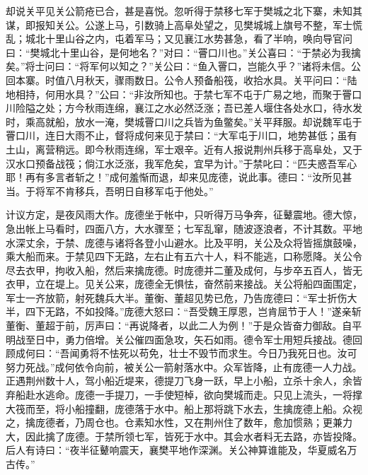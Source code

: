 却说关平见关公箭疮已合，甚是喜悦。忽听得于禁移七军于樊城之北下寨，未知其谋，即报知关公。公遂上马，引数骑上高阜处望之，见樊城城上旗号不整，军士慌乱；城北十里山谷之内，屯着军马；又见襄江水势甚急，看了半响，唤向导官问曰：“樊城北十里山谷，是何地名？”对曰：“罾口川也。”关公喜曰：“于禁必为我擒矣。”将士问曰：“将军何以知之？”关公曰：“鱼入罾口，岂能久乎？”诸将未信。公回本寨。时值八月秋天，骤雨数日。公令人预备船筏，收拾水具。关平问曰：“陆地相持，何用水具？”公曰：“非汝所知也。于禁七军不屯于广易之地，而聚于罾口川险隘之处；方今秋雨连绵，襄江之水必然泛涨；吾已差人堰住各处水口，待水发时，乘高就船，放水一淹，樊城罾口川之兵皆为鱼鳖矣。”关平拜服。却说魏军屯于罾口川，连日大雨不止，督将成何来见于禁曰：“大军屯于川口，地势甚低；虽有土山，离营稍远。即今秋雨连绵，军士艰辛。近有人报说荆州兵移于高阜处，又于汉水口预备战筏；倘江水泛涨，我军危矣，宜早为计。”于禁叱曰：“匹夫惑吾军心耶！再有多言者斩之！”成何羞惭而退，却来见庞德，说此事。德曰：“汝所见甚当。于将军不肯移兵，吾明日自移军屯于他处。”

计议方定，是夜风雨大作。庞德坐于帐中，只听得万马争奔，征鼙震地。德大惊，急出帐上马看时，四面八方，大水骤至；七军乱窜，随波逐浪者，不计其数。平地水深丈余，于禁、庞德与诸将各登小山避水。比及平明，关公及众将皆摇旗鼓噪，乘大船而来。于禁见四下无路，左右止有五六十人，料不能逃，口称愿降。关公令尽去衣甲，拘收入船，然后来擒庞德。时庞德并二董及成何，与步卒五百人，皆无衣甲，立在堤上。见关公来，庞德全无惧怯，奋然前来接战。关公将船四面围定，军士一齐放箭，射死魏兵大半。董衡、董超见势已危，乃告庞德曰：“军士折伤大半，四下无路，不如投降。”庞德大怒曰：“吾受魏王厚恩，岂肯屈节于人！”遂亲斩董衡、董超于前，厉声曰：“再说降者，以此二人为例！”于是众皆奋力御敌。自平明战至日中，勇力倍增。关公催四面急攻，矢石如雨。德令军士用短兵接战。德回顾成何曰：“吾闻勇将不怯死以苟免，壮士不毁节而求生。今日乃我死日也。汝可努力死战。”成何依令向前，被关公一箭射落水中。众军皆降，止有庞德一人力战。正遇荆州数十人，驾小船近堤来，德提刀飞身一跃，早上小船，立杀十余人，余皆弃船赴水逃命。庞德一手提刀，一手使短棹，欲向樊城而走。只见上流头，一将撑大筏而至，将小船撞翻，庞德落于水中。船上那将跳下水去，生擒庞德上船。众视之，擒庞德者，乃周仓也。仓素知水性，又在荆州住了数年，愈加惯熟；更兼力大，因此擒了庞德。于禁所领七军，皆死于水中。其会水者料无去路，亦皆投降。后人有诗曰：“夜半征鼙响震天，襄樊平地作深渊。关公神算谁能及，华夏威名万古传。”

